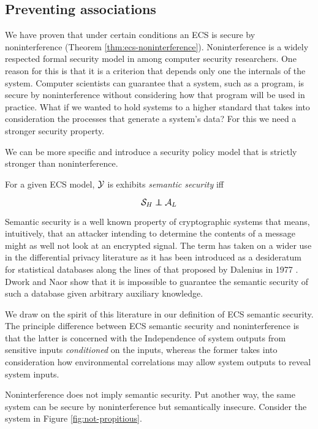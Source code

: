 \documentclass[../thesis.tex]{subfiles}
\begin{document}
\subsection{Preventing associations}
\label{sec:prevention}

We have proven that under certain conditions
an ECS is secure by noninterference
(Theorem \ref{thm:ecs-noninterference}).
Noninterference is a widely respected formal
security model in among computer security
researchers.
One reason for this is that it is a criterion
that depends only one the internals of the
system.
Computer scientists can guarantee that a system,
such as a program, is secure by noninterference
without considering how that program will be used
in practice.
What if we wanted to hold systems to a higher standard
that takes into consideration the processes that generate
a system's data?
For this we need a stronger security property.

We can be more specific and introduce a security policy model
that is strictly stronger than noninterference.

\begin{dfn} %
  For a given ECS model, $\mathcal{Y}$ is
  exhibits \emph{semantic security} iff

  $$ \mc{S}_H \independent \A_L $$
\end{dfn}

Semantic security is a well known property of
cryptographic systems that means, intuitively,
that an attacker intending to determine the
contents of a message might as well not look at
an encrypted signal.
The term has taken on a wider use in the differential
privacy literature as it has been introduced
as a desideratum for statistical
databases along the lines of that proposed
by Dalenius in 1977 \cite{dalenius77statistik, dwork06icalp}. 
Dwork and Naor \cite{dwork06icalp,dwork08jpc} show that it is impossible to
guarantee the semantic security of such a database
given arbitrary auxiliary knowledge.

We draw on the spirit of this literature in our
definition of ECS semantic security.
The principle difference between ECS semantic
security and noninterference is that the
latter is concerned with the Independence of
system outputs from sensitive inputs
\emph{conditioned} on the inputs,
whereas the former takes into consideration
how environmental correlations may allow
system outputs to reveal system inputs.

Noninterference does not imply semantic security.
Put another way, the same system can be secure by
noninterference but semantically insecure.
Consider the system in Figure \ref{fig:not-propitious}.
\end{document}
